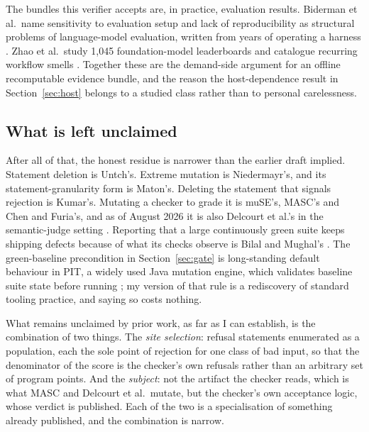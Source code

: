 \documentclass[11pt]{article}
\begin{document}
The bundles this verifier accepts are, in practice, evaluation results. Biderman et al.\
name sensitivity to evaluation setup and lack of reproducibility as structural problems of
language-model evaluation, written from years of operating a harness
\citep{biderman2024lessons}. Zhao et al.\ study 1,045 foundation-model leaderboards and
catalogue recurring workflow smells \citep{zhao2025lbops}. Together these are the demand-side
argument for an offline recomputable evidence bundle, and the reason the host-dependence
result in Section~\ref{sec:host} belongs to a studied class rather than to personal
carelessness.

\subsection{What is left unclaimed}
\label{sec:related-unclaimed}

After all of that, the honest residue is narrower than the earlier draft implied. Statement
deletion is Untch's. Extreme mutation is Niedermayr's, and its statement-granularity form is
Maton's. Deleting the statement that signals rejection is Kumar's. Mutating a checker to
grade it is muSE's, MASC's and Chen and Furia's, and as of August 2026 it is also Delcourt
et al.'s in the semantic-judge setting \citep{delcourt2026judge}. Reporting that a large
continuously green suite keeps shipping defects because of what its checks observe is Bilal
and Mughal's \citep{bilal2026allgreen}. The green-baseline precondition in
Section~\ref{sec:gate} is long-standing default behaviour in PIT, a widely used Java
mutation engine, which validates baseline suite state before running
\citep{pitest_faq}; my version of that rule is a rediscovery of standard tooling practice,
and saying so costs nothing.

What remains unclaimed by prior work, as far as I can establish, is the combination of two
things. The \emph{site selection}: refusal statements enumerated as a population, each the
sole point of rejection for one class of bad input, so that the denominator of the score is
the checker's own refusals rather than an arbitrary set of program points. And the
\emph{subject}: not the artifact the checker reads, which is what MASC and Delcourt et al.\
mutate, but the checker's own acceptance logic, whose verdict is published. Each of the two
is a specialisation of something already published, and the combination is narrow.
\end{document}
